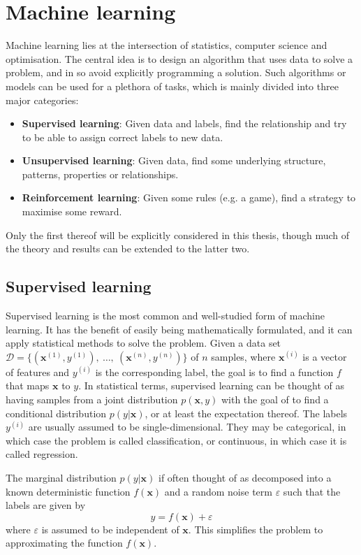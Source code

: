\chapter{Machine learning}
\label{chap:ml}
Machine learning lies at the intersection of statistics, computer science and optimisation.
The central idea is to design an algorithm that uses data to solve a problem, and in so avoid explicitly programming a solution.
Such algorithms or models can be used for a plethora of tasks, which is mainly divided into three major categories:
\begin{itemize}
    \item \textbf{Supervised learning}: Given data and labels, find the relationship and try to be able to assign correct labels to new data.
    \item \textbf{Unsupervised learning}: Given data, find some underlying structure, patterns, properties or relationships.
    \item \textbf{Reinforcement learning}: Given some rules (e.g. a game), find a strategy to maximise some reward.
\end{itemize}
Only the first thereof will be explicitly considered in this thesis, though much of the theory and results can be extended to the latter two.

\section{Supervised learning}
Supervised learning is the most common and well-studied form of machine learning.
It has the benefit of easily being mathematically formulated, and it can apply statistical methods to solve the problem.
Given a data set
$
    \mathcal{D} = \{
    (\bm{x}^{(1)}, y^{(1)}), \
    \dots, \
    (\bm{x}^{(n)}, y^{(n)})
    \}
$
of $n$ samples, where $\bm{x}^{(i)}$ is a vector of features and $y^{(i)}$ is the corresponding label, the goal is to find a function $f$ that maps $\bm{x}$ to $y$.
In statistical terms, supervised learning can be thought of as having samples from a joint distribution $p(\bm{x}, y)$ with the goal of to find a conditional distribution $p(y|\bm{x})$, or at least the expectation thereof.
The labels $y^{(i)}$ are usually assumed to be single-dimensional.
They may be categorical, in which case the problem is called classification, or continuous, in which case it is called regression.

The marginal distribution $p(y|\bm{x})$ if often thought of as decomposed into a known deterministic function $f(\bm{x})$ and a random noise term $\varepsilon$ such that the labels are given by
\begin{equation}
    y = f(\bm{x}) + \varepsilon
    \label{eq:ml_model}
\end{equation}
where $\varepsilon$ is assumed to be independent of $\bm{x}$. This simplifies the problem to approximating the function $f(\bm{x})$.

